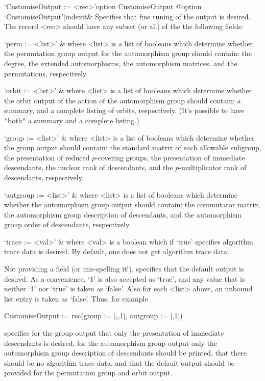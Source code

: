 \>`CustomiseOutput := <rec>'{option CustomiseOutput}%
@{option `CustomiseOutput'|indexit}&
Specifies that fine tuning of the output is  desired.  The  record  <rec>
should have any subset (or all) of the the following fields:

\quad`perm := <list>' &
where  <list>  is  a  list  of  booleans  which  determine  whether   the
permutation group output for the automorphism group should  contain:  the
degree, the extended automorphisms, the automorphism  matrices,  and  the
permutations, respectively.

\quad`orbit := <list>' &
where <list> is a list of booleans  which  determine  whether  the  orbit
output of the action of the automorphism group should contain: a summary,
and a complete listing of orbits, respectively. (It's  possible  to  have
*both* a summary and a complete listing.)

\quad`group := <list>' &
where <list> is a list of booleans  which  determine  whether  the  group
output should contain: the standard matrix of  each  allowable  subgroup,
the presentation of reduced  $p$-covering  groups,  the  presentation  of
immediate  descendants,  the  nuclear  rank  of  descendants,   and   the
$p$-multiplicator rank of descendants, respectively.

\quad`autgroup := <list>' &
where  <list>  is  a  list  of  booleans  which  determine  whether   the
automorphism group output should  contain:  the  commutator  matrix,  the
automorphism group description of descendants, and the automorphism group
order of descendants, respectively.

\quad`trace := <val>' &
where <val> is a boolean which if `true' specifies algorithm  trace  data
is desired. By default, one does not get algorithm trace data.

Not providing a field (or mis-spelling it!), specifies that  the  default
output is desired. As a convenience, `1' is also accepted as `true',  and
any value that is neither `1' nor `true' is taken as  `false'.  Also  for
each <list> above, an unbound list entry is taken as `false'.  Thus,  for
example

\begintt
CustomiseOutput := rec(group := [,,1], autgroup := [,1])
\endtt

specifies for the group output that only the  presentation  of  immediate
descendants is desired,  for  the  automorphism  group  output  only  the
automorphism group description of descendants  should  be  printed,  that
there should be no algorithm trace data,  and  that  the  default  output
should be provided for the permutation group and orbit output.


